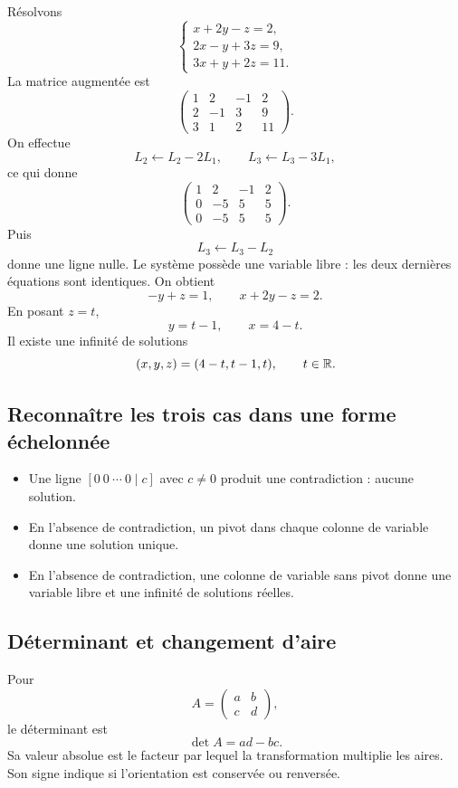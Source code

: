 Résolvons
\[
\begin{cases}
x+2y-z=2,\\
2x-y+3z=9,\\
3x+y+2z=11.
\end{cases}
\]
La matrice augmentée est
\[
\left(
\begin{array}{ccc|c}
1&2&-1&2\\
2&-1&3&9\\
3&1&2&11
\end{array}
\right).
\]
On effectue
\[
L_2\leftarrow L_2-2L_1,
\qquad
L_3\leftarrow L_3-3L_1,
\]
ce qui donne
\[
\left(
\begin{array}{ccc|c}
1&2&-1&2\\
0&-5&5&5\\
0&-5&5&5
\end{array}
\right).
\]
Puis
\[
L_3\leftarrow L_3-L_2
\]
donne une ligne nulle. Le système possède une variable libre : les deux dernières équations sont identiques. On obtient
\[
-y+z=1,
\qquad
x+2y-z=2.
\]
En posant $z=t$,
\[
y=t-1,
\qquad
x=4-t.
\]
Il existe une infinité de solutions
\[
(x,y,z)=(4-t,t-1,t),
\qquad t\in\mathbb{R}.
\]

\subsection{Reconnaître les trois cas dans une forme échelonnée}

\begin{itemize}
\item Une ligne $[0\ 0\ \cdots\ 0\mid c]$ avec $c\neq0$ produit une contradiction : aucune solution.
\item En l’absence de contradiction, un pivot dans chaque colonne de variable donne une solution unique.
\item En l’absence de contradiction, une colonne de variable sans pivot donne une variable libre et une infinité de solutions réelles.
\end{itemize}

\subsection{Déterminant et changement d'aire}

Pour
\[
A=\begin{pmatrix}a&b\\c&d\end{pmatrix},
\]
le déterminant est
\[
\det A=ad-bc.
\]
Sa valeur absolue est le facteur par lequel la transformation multiplie les aires. Son signe indique si l'orientation est conservée ou renversée.

